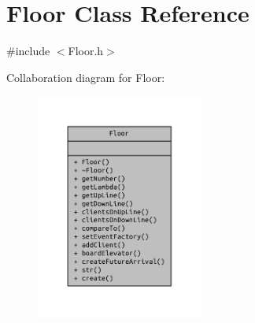\section{Floor Class Reference}
\label{class_floor}


{\ttfamily \#include $<$Floor.\+h$>$}



Collaboration diagram for Floor\+:\nopagebreak
\begin{figure}[H]
\begin{center}
\leavevmode
\includegraphics[width=156pt]{class_floor__coll__graph}
\end{center}
\end{figure}
